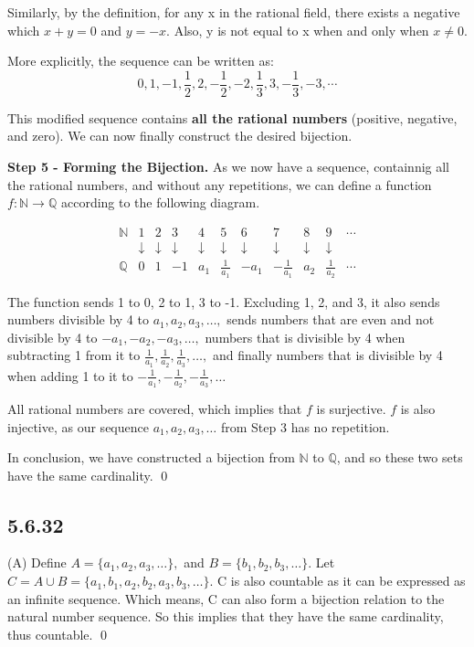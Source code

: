 \documentclass{article}
\begin{document}
Similarly, by the definition, for any x in the rational field, there exists a negative which $x+y=0$ and $y=-x$. Also, y is not equal to x when and only when $x\neq0$.

More explicitly, the sequence can be written as: $$0,1,-1,\frac12,2,-\frac12,-2,\frac13,3,-\frac13,-3,\cdots$$

This modified sequence contains \textbf{all the rational numbers} (positive, negative, and zero). We can now finally construct the desired bijection.

\textbf{Step 5 - Forming the Bijection.} As we now have a sequence, containnig all the rational numbers, and without any repetitions, we can define a function $f:\mathbb{N}\rightarrow\mathbb{Q}$ according to the following diagram. 

\setcounter{MaxMatrixCols}{15}

\begin{equation*}\begin{matrix}\mathbb{N} & 1 & 2 & 3 & 4 & 5 & 6 & 7 & 8 & 9 & \cdots \\&\downarrow&\downarrow&\downarrow&\downarrow&\downarrow&\downarrow&\downarrow&\downarrow&\downarrow&\\\mathbb{Q} & 0 & 1 & -1 & a_1 & \frac{1}{a_1} & -a_1 & -\frac{1}{a_1} & a_2 & \frac{1}{a_2} & \cdots \end{matrix}\end{equation*}

The function sends 1 to 0, 2 to 1, 3 to -1. Excluding 1, 2, and 3, it also sends numbers divisible by 4 to $a_1,a_2,a_3,\ldots,$ sends numbers that are even and not divisible by 4 to $-a_1, -a_2, -a_3, \ldots,$ numbers that is divisible by 4 when subtracting 1 from it to $\frac{1}{a_1},\frac{1}{a_2},\frac{1}{a_3},\ldots,$ and finally numbers that is divisible by 4 when adding 1 to it to $-\frac{1}{a_1},-\frac{1}{a_2},-\frac{1}{a_3},\ldots$

All rational numbers are covered, which implies that $f$ is surjective. $f$ is also injective, as our sequence $a_1, a_2, a_3,\ldots$ from Step 3 has no repetition.

In conclusion, we have constructed a bijection from $\mathbb{N}$ to $\mathbb{Q}$, and so these two sets have the same cardinality. \qed

\subsection*{5.6.32}

(A) Define $A=\{a_1,a_2,a_3,\ldots\},$ and $B=\{b_1,b_2,b_3,\ldots\}.$ Let $C=A\cup B=\{a_1,b_1,a_2,b_2,a_3,b_3,\ldots\}$. C is also countable as it can be expressed as an infinite sequence. Which means, C can also form a bijection relation to the natural number sequence. So this implies that they have the same cardinality, thus countable. \qed
\end{document}
